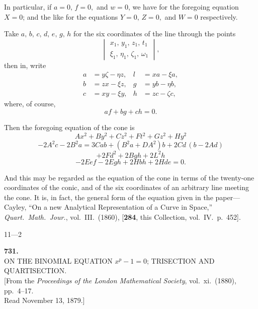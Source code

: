 \documentclass[11pt]{article}
\begin{document}
\medskip

\noindent
In particular, if $a = 0,\, f = 0,$ and $w = 0$, we have for the foregoing equation $X = 0$;
and the like for the equations $Y = 0,\, Z = 0,$ and $W = 0$ respectively.

\medskip

\noindent
Take $a,\,b,\,c,\,d,\,e,\,g,\,h$ for the six coordinates of the line through the points
\[
\begin{vmatrix}
x_1,\,y_1,\,z_1,\,t_1\\
\xi_1,\,\eta_1,\,\zeta_1,\,\omega_1
\end{vmatrix},
\]
then in, write
\begin{align*}
a &= y\zeta - \eta z,& l &= xa - \xi a,\\
b &= zx - \xi z,& g &= yb - \eta b,\\
c &= xy - \xi y,& h &= zc - \zeta c,
\end{align*}
where, of course,
\[
af + bg + ch = 0.
\]

\noindent
Then the foregoing equation of the cone is
\[
Ax^2 + By^2 + Cz^2 + Ft^2 + Gz^2 + Hy^2
\]
\[
- 2A^2c - 2B^2a = 3Cab + (B^2a + DA^2)b + 2Cd\,(b - 2Ad)
\]
\[
+ 2Fd^2 + 2Bgh + 2L^2h
\]
\[
- 2Eef - 2Egh + 2Hbh + 2Hde = 0.
\]

\noindent
And this may be regarded as the equation of the cone in terms of the twenty-one
coordinates of the conic, and of the six coordinates of an arbitrary line meeting the
cone. It is, in fact, the general form of the equation given in the paper---Cayley,
``On a new Analytical Representation of a Curve in Space,'' \textit{Quart.\ Math.\ Jour.},
vol.~III.\ (1860), [\textbf{284}, this Collection, vol.~IV.\ p.~452].

\medskip

\hfill 11---2

\newpage

\begin{center}
\textbf{731.}\\[4pt]
\textsc{ON THE BINOMIAL EQUATION $x^p - 1 = 0$; TRISECTION AND QUARTISECTION.}\\[6pt]
\small[From the \textit{Proceedings of the London Mathematical Society}, vol.~xi.\ (1880), pp.~4--17.\\
Read November 13, 1879.]
\end{center}
\end{document}
